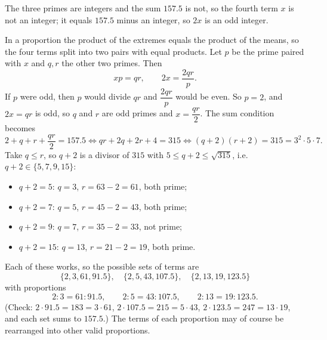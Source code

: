 The three primes are integers and the sum $157.5$ is not, so the fourth term $x$ is not an integer; it equals $157.5$ minus an integer, so $2x$ is an odd integer.

In a proportion the product of the extremes equals the product of the means, so the four terms split into two pairs with equal products. Let $p$ be the prime paired with $x$ and $q,r$ the other two primes. Then
\[xp=qr,\qquad 2x=\dfrac{2qr}{p}.\]
If $p$ were odd, then $p$ would divide $qr$ and $\dfrac{2qr}{p}$ would be even. So $p=2$, and $2x=qr$ is odd, so $q$ and $r$ are odd primes and $x=\dfrac{qr}{2}$. The sum condition becomes
\[2+q+r+\dfrac{qr}{2}=157.5\iff qr+2q+2r+4=315\iff(q+2)(r+2)=315=3^2\cdot5\cdot7.\]
Take $q\le r$, so $q+2$ is a divisor of $315$ with $5\le q+2\le\sqrt{315}$, i.e. $q+2\in\{5,7,9,15\}$:
\begin{itemize}
\item $q+2=5$: $q=3$, $r=63-2=61$, both prime;
\item $q+2=7$: $q=5$, $r=45-2=43$, both prime;
\item $q+2=9$: $q=7$, $r=35-2=33$, not prime;
\item $q+2=15$: $q=13$, $r=21-2=19$, both prime.
\end{itemize}
Each of these works, so the possible sets of terms are
\[\boxed{\{2,3,61,91.5\},\quad\{2,5,43,107.5\},\quad\{2,13,19,123.5\}}\]
with proportions
\[2:3=61:91.5,\qquad 2:5=43:107.5,\qquad 2:13=19:123.5.\]
(Check: $2\cdot91.5=183=3\cdot61$, $2\cdot107.5=215=5\cdot43$, $2\cdot123.5=247=13\cdot19$, and each set sums to $157.5$.) The terms of each proportion may of course be rearranged into other valid proportions.
